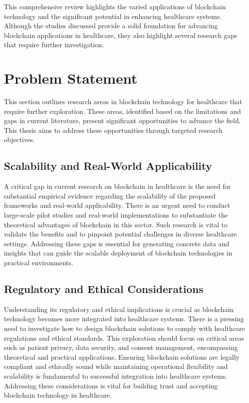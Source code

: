 \documentclass[cic,tc,english]{iiufrgs}
\begin{document}
    This comprehensive review highlights the varied applications of blockchain technology and the significant potential in enhancing healthcare systems. Although the studies discussed provide a solid foundation for advancing blockchain applications in healthcare, they also highlight several research gaps that require further investigation.

\section{Problem Statement}

        This section outlines research areas in blockchain technology for healthcare that require further exploration. These areas, identified based on the limitations and gaps in current literature, present significant opportunities to advance the field. This thesis aims to address these opportunities through targeted research objectives.

        \subsection{Scalability and Real-World Applicability} 
            A critical gap in current research on blockchain in healthcare is the need for substantial empirical evidence regarding the scalability of the proposed frameworks and real-world applicability. There is an urgent need to conduct large-scale pilot studies and real-world implementations to substantiate the theoretical advantages of blockchain in this sector. Such research is vital to validate the benefits and to pinpoint potential challenges in diverse healthcare settings. Addressing these gaps is essential for generating concrete data and insights that can guide the scalable deployment of blockchain technologies in practical environments.

        \subsection{Regulatory and Ethical Considerations} 
            Understanding its regulatory and ethical implications is crucial as blockchain technology becomes more integrated into healthcare systems. There is a pressing need to investigate how to design blockchain solutions to comply with healthcare regulations and ethical standards. This exploration should focus on critical areas such as patient privacy, data security, and consent management, encompassing theoretical and practical applications. Ensuring blockchain solutions are legally compliant and ethically sound while maintaining operational flexibility and scalability is fundamental to successful integration into healthcare systems. Addressing these considerations is vital for building trust and accepting blockchain technology in healthcare.
\end{document}
